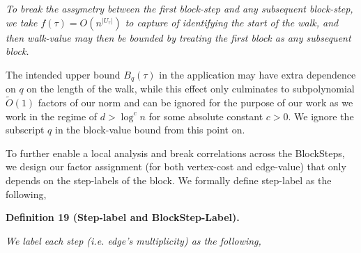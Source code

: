 \documentclass[10pt,a4paper]{article}
\begin{document}
\emph{To break the assymetry between the first block-step and any subsequent block-step, we take $f(\tau)=O(n^{|U_{\tau}|})$ to capture of identifying the start of the walk, and then walk-value may then be bounded by treating the first block as any subsequent block.}\par






The intended upper bound $B_{q}(\tau)$ in the application may have extra dependence on $q$ on the length of the walk, while this effect only culminates to subpolynomial $\tilde{O}(1)$ factors of our norm and can be ignored for the purpose of our work as we work in the regime of $d>\log^{c}n$ for some absolute constant $c>0$. We ignore the subscript $q$ in the block-value bound from this point on.\par




To further enable a local analysis and break correlations across the BlockSteps, we design our factor assignment (for both vertex-cost and edge-value) that only depends on the step-labels of the block. We formally define step-label as the following,\par





\par\medskip\noindent\textbf{
\textbf{Definition 19}\textbf{ }(Step-label and BlockStep-Label)\textbf{.}
}\par



\emph{We label each step (i.e. edge’s multiplicity) as the following,}\par
\end{document}
